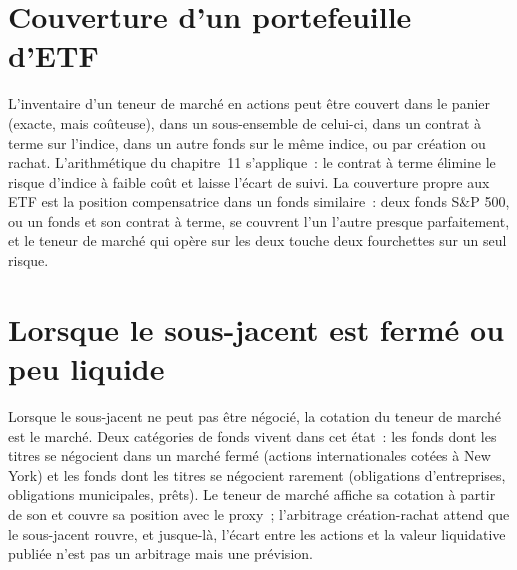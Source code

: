 \section{Couverture d'un portefeuille d'ETF}

L'inventaire d'un teneur de marché en actions peut être couvert dans le panier (exacte, mais coûteuse), dans un sous-ensemble de celui-ci, dans un contrat à terme sur l'indice, dans un autre fonds sur
le même indice, ou par création ou rachat. L'arithmétique du chapitre~11 s'applique~: le contrat à terme élimine le risque d'indice à faible coût et laisse l'écart
de suivi. La couverture propre aux ETF est la position compensatrice dans un fonds similaire~: deux fonds S\&P 500, ou un fonds et son contrat à terme, se couvrent
l'un l'autre presque parfaitement, et le teneur de marché qui opère sur les deux touche deux fourchettes sur un seul risque.

\section{Lorsque le sous-jacent est fermé ou peu liquide}

Lorsque le sous-jacent ne peut pas être négocié, la cotation du teneur de marché est le marché. Deux catégories de fonds vivent dans cet état~: les fonds dont les titres se négocient dans un
marché fermé (actions internationales cotées à New York) et les fonds dont les titres se négocient rarement (obligations d'entreprises, obligations municipales, prêts).
Le teneur de marché affiche sa cotation à partir de son  et couvre sa position avec le proxy~; l'arbitrage création-rachat attend que le sous-jacent rouvre, et
jusque-là, l'écart entre les actions et la valeur liquidative publiée n'est pas un arbitrage mais une prévision.

